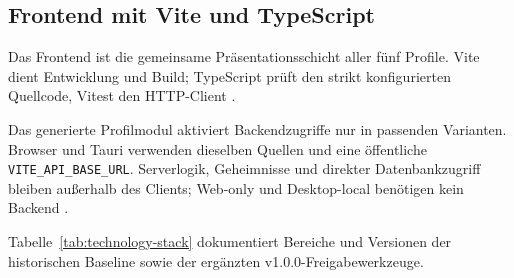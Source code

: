 \subsection{Frontend mit Vite und TypeScript}
\label{subsec:frontend-vite-typescript}

Das Frontend ist die gemeinsame Präsentationsschicht aller fünf Profile. Vite
dient Entwicklung und Build; TypeScript prüft den strikt konfigurierten
Quellcode, Vitest den HTTP-Client
\parencite{vite2026guide,typescript2026handbook}.

Das generierte Profilmodul aktiviert Backendzugriffe nur in passenden
Varianten. Browser und Tauri verwenden dieselben Quellen und eine öffentliche
\texttt{VITE\_API\_BASE\_URL}. Serverlogik, Geheimnisse und direkter
Datenbankzugriff bleiben außerhalb des Clients; Web-only und Desktop-local
benötigen kein Backend
\parencite{kleiveist2026architecture,kleiveist2026profiles}.

Tabelle~\ref{tab:technology-stack} dokumentiert Bereiche und Versionen der
historischen Baseline sowie der ergänzten v1.0.0-Freigabewerkzeuge.


